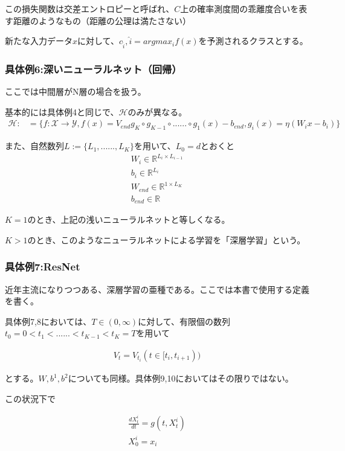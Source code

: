 \documentclass{jsarticle}
\begin{document}
この損失関数は交差エントロピーと呼ばれ、$C$上の確率測度間の乖離度合いを表す距離のようなもの（距離の公理は満たさない）

新たな入力データ$x$に対して、$c_{\hat{i}},\hat{i}=argmax_i f(x)$を予測されるクラスとする。


\subsubsection{具体例6:深いニューラルネット（回帰）}
ここでは中間層がN層の場合を扱う。

基本的には具体例4と同じで、$\mathcal{H}$のみが異なる。
\begin{align}
\mathcal{H}:&=\{f:\mathcal{X}\to\mathcal{Y},f(x)=V_{end}g_K\circ g_{K-1}\circ......\circ g_1(x)-b_{end},g_i(x)=\eta(W_ix-b_i)\}
\end{align}





また、自然数列$L:=\{L_1,......,L_K\}$を用いて、$L_0=d$とおくと
\begin{align}
W_i\in \mathbb{R}^{ L_i\times L_{i-1}}\\
b_i\in \mathbb{R}^{L_i}\\
W_{end}\in\mathbb{R}^{1\times L_K}\\
b_{end}\in\mathbb{R}
\end{align}

$K=1$のとき、上記の浅いニューラルネットと等しくなる。

$K>1$のとき、このようなニューラルネットによる学習を「深層学習」という。


\subsubsection{具体例7:ResNet}
近年主流になりつつある、深層学習の亜種である。ここでは本書で使用する定義を書く。


具体例7,8においては、$T\in(0,\infty)$に対して、有限個の数列$t_0=0<t_1<......<t_{K-1}<t_K=T$を用いて

\begin{align}
V_t=V_{t_i} (t\in[t_i,t_{i+1}))
\end{align}

とする。$W,b^1,b^2$についても同様。具体例9,10においてはその限りではない。

この状況下で

\begin{align}
\frac{dX^i_t}{dt}=g(t,X^i_t)\\
X^i_0=x_i
\end{align}
\end{document}
